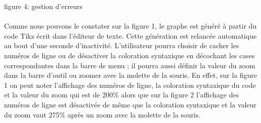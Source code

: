 \documentclass[a4paper]{report}
\begin{document}
figure 4: gestion d'erreurs
\\
\\
	Comme nous pouvons le constater sur la figure 1, le graphe est généré à partir du code Tikz écrit dans l'éditeur de texte. Cette génération est relancée automatique au bout d'une seconde d'inactivité. L'utilisateur pourra choisir de cacher les numéros de ligne ou de désactiver la coloration syntaxique en décochant les cases correspondantes dans la barre de menu ; il pourra aussi définir la valeur du zoom dans la barre d'outil ou zoomer avec la molette de la souris. En effet, sur la figure 1 on peut noter l'affichage des numéros de ligne, la coloration syntaxique du code et la valeur du zoom qui est de 200\%
alors que sur la figure 2 l'affichage des numéros de ligne est désactivée de même que la coloration syntaxique et la valeur du zoom vaut 275\% après un zoom avec la molette de la souris.
\end{document}
